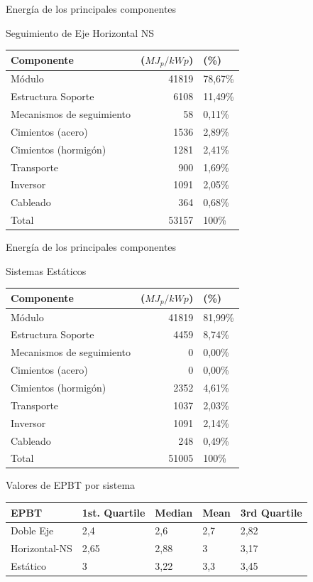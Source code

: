 \documentclass[xcolor={usenames,svgnames,dvipsnames}]{beamer}
\begin{document}
\begin{frame}[label={sec:org5379fc7}]{Energía de los principales componentes}
\begin{block}{Seguimiento de Eje Horizontal NS}
\begin{center}
\begin{tabular}{lrl}
Componente & (\(MJ_{p}/kWp\)) & (\%)\\
\hline
Módulo & 41819 & 78,67\%\\
Estructura Soporte & 6108 & 11,49\%\\
Mecanismos de seguimiento & 58 & 0,11\%\\
Cimientos (acero) & 1536 & 2,89\%\\
Cimientos (hormigón) & 1281 & 2,41\%\\
Transporte & 900 & 1,69\%\\
Inversor & 1091 & 2,05\%\\
Cableado & 364 & 0,68\%\\
Total & 53157 & 100\%\\
\end{tabular}
\end{center}
\end{block}
\end{frame}

\begin{frame}[label={sec:orgf878312}]{Energía de los principales componentes}
\begin{block}{Sistemas Estáticos}
\begin{center}
\begin{tabular}{lrl}
Componente & (\(MJ_{p}/kWp\)) & (\%)\\
\hline
Módulo & 41819 & 81,99\%\\
Estructura Soporte & 4459 & 8,74\%\\
Mecanismos de seguimiento & 0 & 0,00\%\\
Cimientos (acero) & 0 & 0,00\%\\
Cimientos (hormigón) & 2352 & 4,61\%\\
Transporte & 1037 & 2,03\%\\
Inversor & 1091 & 2,14\%\\
Cableado & 248 & 0,49\%\\
Total & 51005 & 100\%\\
\end{tabular}
\end{center}
\end{block}
\end{frame}

\begin{frame}[label={sec:orgcc54077}]{Valores de EPBT por sistema}
\begin{center}
\begin{tabular}{lllll}
EPBT & 1st. Quartile & Median & Mean & 3rd Quartile\\
\hline
Doble Eje & 2,4 & 2,6 & 2,7 & 2,82\\
Horizontal-NS & 2,65 & 2,88 & 3 & 3,17\\
Estático & 3 & 3,22 & 3,3 & 3,45\\
\end{tabular}
\end{center}
\end{frame}
\end{document}
